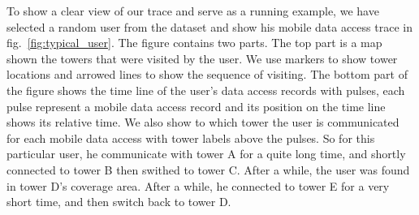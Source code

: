 To show a clear view of our trace and serve as a running example, we have selected a random user from the dataset and show his mobile data access trace in fig.~\ref{fig:typical_user}. The figure contains two parts. The top part is a map shown the towers that were visited by the user. We use markers to show tower locations and arrowed lines to show the sequence of visiting. The bottom part of the figure shows the time line of the user's data access records with pulses, each pulse represent a mobile data access record and its position on the time line shows its relative time. We also show to which tower the user is communicated for each mobile data access with tower labels above the pulses. So for this particular user, he communicate with tower A for a quite long time, and shortly connected to tower B then swithed to tower C. After a while, the user was found in tower D's coverage area. After a while, he connected to tower E for a very short time, and then switch back to tower D.